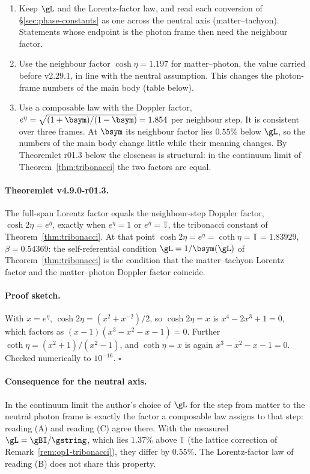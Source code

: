 \begin{enumerate}[leftmargin=2em]
\item[(A)] Keep \(\gL\) and the Lorentz-factor law, and read each conversion of \S\ref{sec:phase-constants} as one across
the neutral axis (matter--tachyon).  Statements whose endpoint is the photon frame then need the neighbour factor.
\item[(B)] Use the neighbour factor \(\cosh\eta=1.197\) for matter--photon, the value carried before v2.29.1, in line with
the neutral assumption.  This changes the photon-frame numbers of the main body (table below).
\item[(C)] Use a composable law with the Doppler factor, \(e^{\eta}=\sqrt{(1+\bsym)/(1-\bsym)}=1.854\) per neighbour step.
It is consistent over three frames.  At \(\bsym\) its neighbour factor lies \(0.55\%\) below \(\gL\), so the numbers of the
main body change little while their meaning changes.  By Theoremlet r01.3 below the closeness is structural: in the
continuum limit of Theorem~\ref{thm:tribonacci} the two factors are equal.
\end{enumerate}

\paragraph{Theoremlet v4.9.0-r01.3.}
The full-span Lorentz factor equals the neighbour-step Doppler factor, \(\cosh2\eta=e^{\eta}\), exactly when \(e^{\eta}=1\)
or \(e^{\eta}=\mathbb T\), the tribonacci constant of Theorem~\ref{thm:tribonacci}.  At that point
\(\cosh2\eta=e^{\eta}=\coth\eta=\mathbb T=1.83929\), \(\beta=0.54369\): the self-referential condition
\(\gL=1/\bsym(\gL)\) of Theorem~\ref{thm:tribonacci} is the condition that the matter--tachyon Lorentz factor and the
matter--photon Doppler factor coincide.

\paragraph{Proof sketch.}
With \(x=e^{\eta}\), \(\cosh2\eta=(x^2+x^{-2})/2\), so \(\cosh2\eta=x\) is \(x^4-2x^3+1=0\), which factors as
\((x-1)(x^3-x^2-x-1)=0\).  Further \(\coth\eta=(x^2+1)/(x^2-1)\), and \(\coth\eta=x\) is again \(x^3-x^2-x-1=0\).
Checked numerically to \(10^{-16}\).  \(\square\)

\paragraph{Consequence for the neutral axis.}
In the continuum limit the author's choice of \(\gL\) for the step from matter to the neutral photon frame is exactly the
factor a composable law assigns to that step: reading (A) and reading (C) agree there.  With the measured
\(\gL=\gBI/\gstring\), which lies \(1.37\%\) above \(\mathbb T\) (the lattice correction of
Remark~\ref{rem:op1-tribonacci}), they differ by \(0.55\%\).  The Lorentz-factor law of reading (B) does not share this
property.

